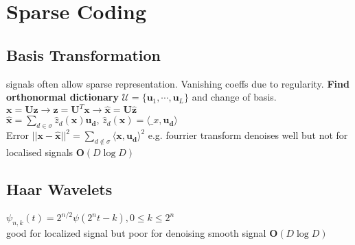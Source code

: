 \section*{Sparse Coding}

\subsection*{Basis Transformation}
signals often allow sparse representation. Vanishing coeffs due to regularity. 
\textbf{Find orthonormal dictionary} $\mathcal{U}{=}\{\mathbf{u}_1,\dotsi,\mathbf{u}_L\}$ and change of basis.\\
$\mathbf{x}=\mathbf{U}\mathbf{z}\rightarrow\mathbf{z}=\mathbf{U}^T\mathbf{x}\rightarrow\mathbf{\hat{x}}=\mathbf{U}\mathbf{\hat{z}}$\\
$\hat{\mathbf{x}}{=}\sum_{d{\in}\sigma}\hat{z}_d(\mathbf{x})\mathbf{u_d}$, $\hat{z}_d(\mathbf{x})=\langle\mathbf_x,\mathbf{u_d}\rangle$\\
Error $||\mathbf{x}{-}\hat{\mathbf{x}}||^2{=}\sum_{d\notin\sigma}\langle\mathbf{x},\mathbf{u_d}\rangle^2$
e.g. fourrier transform denoises well but not for localised signals $\mathbf{O}(D\log D)$

\subsection*{Haar Wavelets}
$\psi_{n,k}(t){=}2^{n/2}\psi(2^nt-k), 0\leq k\leq2^n$\\
good for localized signal but poor for denoising smooth signal $\mathbf{O}(D\log D)$

